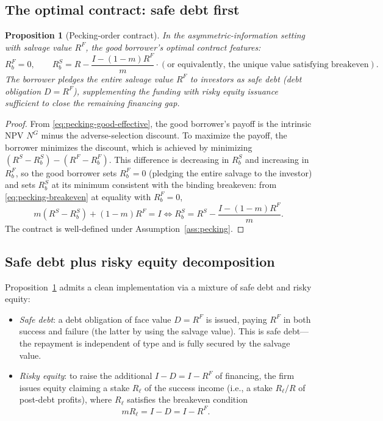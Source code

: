 \documentclass[11pt,a4paper,oneside]{book}
\theoremstyle{plain}
\newtheorem{proposition}[theorem]{Proposition}
\theoremstyle{definition}
\theoremstyle{remark}
\numberwithin{equation}{chapter}
\begin{document}
\subsection{The optimal contract: safe debt first}

\begin{proposition}[Pecking-order contract]\label{prop:pecking-order}
In the asymmetric-information setting with salvage value $R^F$, the good borrower's optimal contract features:
\begin{equation}\label{eq:pecking-order-contract}
  R_b^F = 0,
  \qquad
  R_b^S = R - \frac{I - (1 - m) R^F}{m} \cdot (\text{or equivalently, the unique value satisfying breakeven}).
\end{equation}
The borrower pledges the entire salvage value $R^F$ to investors as safe debt (debt obligation $D = R^F$), supplementing the funding with risky equity issuance sufficient to close the remaining financing gap.
\end{proposition}

\begin{proof}
From \eqref{eq:pecking-good-effective}, the good borrower's payoff is the intrinsic NPV $N^G$ minus the adverse-selection discount.
To maximize the payoff, the borrower minimizes the discount, which is achieved by minimizing $(R^S - R_b^S) - (R^F - R_b^F)$.
This difference is decreasing in $R_b^S$ and increasing in $R_b^F$, so the good borrower sets $R_b^F = 0$ (pledging the entire salvage to the investor) and sets $R_b^S$ at its minimum consistent with the binding breakeven: from \eqref{eq:pecking-breakeven} at equality with $R_b^F = 0$,
\begin{equation*}
  m(R^S - R_b^S) + (1 - m) R^F = I
  \Longleftrightarrow
  R_b^S = R^S - \frac{I - (1 - m) R^F}{m}.
\end{equation*}
The contract is well-defined under Assumption~\ref{ass:pecking}.
\end{proof}

\subsection{Safe debt plus risky equity decomposition}

Proposition~\ref{prop:pecking-order} admits a clean implementation via a mixture of safe debt and risky equity:

\begin{itemize}
  \item \emph{Safe debt}: a debt obligation of face value $D = R^F$ is issued, paying $R^F$ in both success and failure (the latter by using the salvage value).
  This is safe debt---the repayment is independent of type and is fully secured by the salvage value.
  \item \emph{Risky equity}: to raise the additional $I - D = I - R^F$ of financing, the firm issues equity claiming a stake $R_\ell$ of the success income (i.e., a stake $R_\ell/R$ of post-debt profits), where $R_\ell$ satisfies the breakeven condition
  \begin{equation*}
    m R_\ell = I - D = I - R^F.
  \end{equation*}
\end{itemize}
\end{document}

